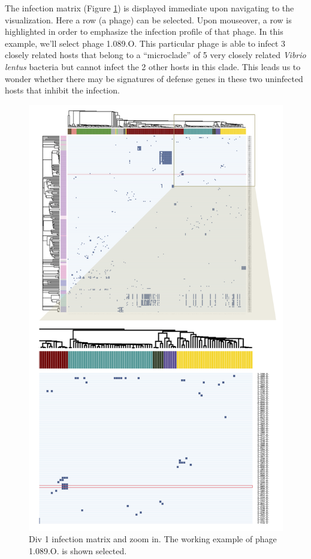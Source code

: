 \documentclass[12pt,twoside]{mitthesis-manusdown}
\begin{document}
The infection matrix (Figure \ref{fig:workflow1}) is displayed immediate
upon navigating to the visualization. Here a row (a phage) can be
selected. Upon mouseover, a row is highlighted in order to emphasize the
infection profile of that phage. In this example, we'll select phage
1.089.O. This particular phage is able to infect 3 closely related hosts
that belong to a ``microclade'' of 5 very closely related \emph{Vibrio
lentus} bacteria but cannot infect the 2 other hosts in this clade. This
leads us to wonder whether there may be signatures of defense genes in
these two uninfected hosts that inhibit the infection.
\begin{figure}[tb!]

{\centering \includegraphics[width=0.8\linewidth]{figuresviz/workflow1} 

}

\caption{\label{fig:workflow1}Div 1 infection matrix and zoom in. The working example of phage 1.089.O. is shown selected.}\label{fig:workflow1}
\end{figure}
\end{document}
